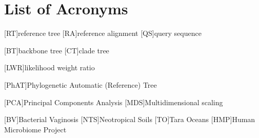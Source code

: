 \documentclass{wissdoc}
\author{\myname}
\title{\mytitle}
\begin{document}
\frontmatter
{}


\blankpage


\blankpage


\blankpage


\blankpage


{\parskip 0pt\tableofcontents}
\blankpage

{
\parskip 0pt
{}
\listoffigures
}
\blankpage

{
\parskip 0pt
{}
\listoftables
}
\blankpage


\chapter*{List of Acronyms}
\begin{acronym}

    [RT]{reference tree}
    [RA]{reference alignment}
    [QS]{query sequence}

    [BT]{backbone tree}
    [CT]{clade tree}

    [LWR]{likelihood weight ratio}

    [PhAT]{Phylogenetic Automatic (Reference) Tree}

    [PCA]{Principal Components Analysis}
    [MDS]{Multidimensional scaling}

    [BV]{Bacterial Vaginosis}
    [NTS]{Neotropical Soils}
    [TO]{Tara Oceans}
    [HMP]{Human Microbiome Project}
\end{acronym}
\blankpage


\end{document}
